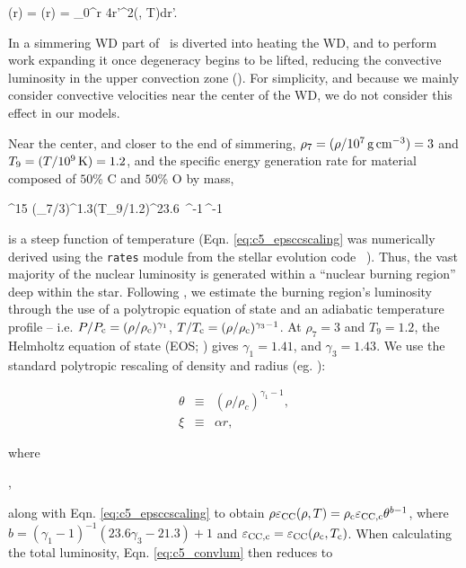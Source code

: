 \eqbegin
\Lconv(r) = \Lcc(r) = \int_0^{r} 4\pi r'^2\rho \epscc(\rho, T)dr'.
\label{eq:c5_convlum}
\eqend

\noindent In a simmering WD part of \Lcc\ is diverted into heating the WD, and to perform work expanding it once degeneracy begins to be lifted, reducing the convective luminosity in the upper convection zone (\citeal{piroc08}).  For simplicity, and because we mainly consider convective velocities near the center of the WD, we do not consider this effect in our models.  

Near the center, and closer to the end of simmering, $\rho_7 = (\rho/10^7\,\gcc) = 3$ and $T_9 = (T/10^9\,\mathrm{K}) = 1.2$, and the specific energy generation rate for material composed of $50$\% C and $50$\% O by mass,

\eqbegin
\epscc {}^{15} \left(\rho_7/3\right)^{1.3}\left(T_9/1.2\right)^{23.6}\,\,\,^{-1}\,^{-1}
\label{eq:c5_epsccscaling}
\eqend

\noindent is a steep function of temperature (Eqn. \ref{eq:c5_epsccscaling} was numerically derived using the \texttt{rates} module from the stellar evolution code \mesa\ \citep{paxt+11}).  Thus, the vast majority of the nuclear luminosity is generated within a ``nuclear burning region'' deep within the star.  Following \citeal{wooswk04}, we estimate the burning region's luminosity through the use of a polytropic equation of state and an adiabatic temperature profile -- i.e. $P/P_\mrm{c} = (\rho/\rhoc)^{\gamma_1}$, $T/\Tc = (\rho/\rhoc)^{\gamma_3-1}$.  At $\rho_7 = 3$ and $T_9 = 1.2$, the Helmholtz equation of state (EOS; \citealt{timms00}) gives $\gamma_1 = 1.41$, and $\gamma_3 = 1.43$.  We use the standard polytropic rescaling of density and radius (eg. \citealt{kippww12}): 

\begin{eqnarray}
\theta &\equiv& (\rho/\rho_c)^{\gamma_1 - 1}, \nonumber \\
\xi &\equiv& \alpha r,
\label{eq:c5_poly_def}
\end{eqnarray}

\noindent where

\eqbegin
\alpha \equiv {},
\label{eq:c5_poly_alpha}
\eqend

\noindent along with Eqn. \ref{eq:c5_epsccscaling} to obtain $\rho\epscc(\rho, T) = \rhoc\epscentral\theta^{b - 1}$, where $b = (\gamma_1 - 1)^{-1}(23.6\gamma_3 - 21.3) + 1$ and $\epscentral = \epscc(\rhoc, \Tc)$.  When calculating the total luminosity, Eqn. \ref{eq:c5_convlum} then reduces to

